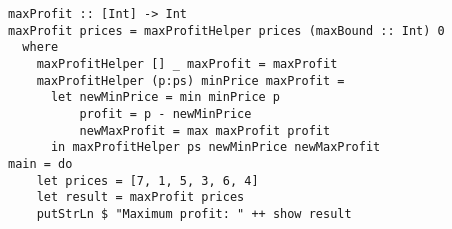 \documentclass[sigconf]{acmart}
\begin{document}
\begin{verbatim}
maxProfit :: [Int] -> Int
maxProfit prices = maxProfitHelper prices (maxBound :: Int) 0
  where
    maxProfitHelper [] _ maxProfit = maxProfit
    maxProfitHelper (p:ps) minPrice maxProfit =
      let newMinPrice = min minPrice p
          profit = p - newMinPrice
          newMaxProfit = max maxProfit profit
      in maxProfitHelper ps newMinPrice newMaxProfit
main = do
    let prices = [7, 1, 5, 3, 6, 4]
    let result = maxProfit prices
    putStrLn $ "Maximum profit: " ++ show result
\end{verbatim}
\end{document}
